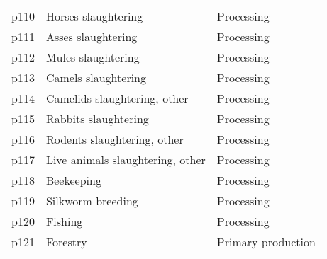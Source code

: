 \documentclass[]{article}
\begin{document}
\begin{longtable}[t]{lll}
p110 & Horses slaughtering & Processing\\
\addlinespace
p111 & Asses slaughtering & Processing\\
p112 & Mules slaughtering & Processing\\
p113 & Camels slaughtering & Processing\\
p114 & Camelids slaughtering, other & Processing\\
p115 & Rabbits slaughtering & Processing\\
\addlinespace
p116 & Rodents slaughtering, other & Processing\\
p117 & Live animals slaughtering, other & Processing\\
p118 & Beekeeping & Processing\\
p119 & Silkworm breeding & Processing\\
p120 & Fishing & Processing\\
p121 & Forestry & Primary production\\*
\end{longtable}
\end{document}
